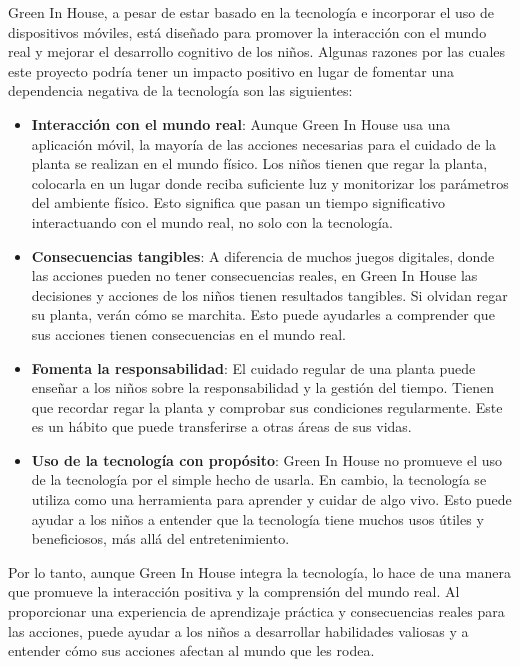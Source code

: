 Green In House, a pesar de estar basado en la tecnología e incorporar el uso de dispositivos móviles, está diseñado para promover la interacción con el mundo real y mejorar el desarrollo cognitivo de los niños. Algunas razones por las cuales este proyecto podría tener un impacto positivo en lugar de fomentar una dependencia negativa de la tecnología son las siguientes:

\begin{itemize}

    \item \textbf{Interacción con el mundo real}: Aunque Green In House usa una aplicación móvil, la mayoría de las acciones necesarias para el cuidado de la planta se realizan en el mundo físico. Los niños tienen que regar la planta, colocarla en un lugar donde reciba suficiente luz y monitorizar los parámetros del ambiente físico. Esto significa que pasan un tiempo significativo interactuando con el mundo real, no solo con la tecnología.
    
    \item \textbf{Consecuencias tangibles}: A diferencia de muchos juegos digitales, donde las acciones pueden no tener consecuencias reales, en Green In House las decisiones y acciones de los niños tienen resultados tangibles. Si olvidan regar su planta, verán cómo se marchita. Esto puede ayudarles a comprender que sus acciones tienen consecuencias en el mundo real.
    
    \item \textbf{Fomenta la responsabilidad}: El cuidado regular de una planta puede enseñar a los niños sobre la responsabilidad y la gestión del tiempo. Tienen que recordar regar la planta y comprobar sus condiciones regularmente. Este es un hábito que puede transferirse a otras áreas de sus vidas.
    
    \item \textbf{Uso de la tecnología con propósito}: Green In House no promueve el uso de la tecnología por el simple hecho de usarla. En cambio, la tecnología se utiliza como una herramienta para aprender y cuidar de algo vivo. Esto puede ayudar a los niños a entender que la tecnología tiene muchos usos útiles y beneficiosos, más allá del entretenimiento.

\end{itemize}

Por lo tanto, aunque Green In House integra la tecnología, lo hace de una manera que promueve la interacción positiva y la comprensión del mundo real. Al proporcionar una experiencia de aprendizaje práctica y consecuencias reales para las acciones, puede ayudar a los niños a desarrollar habilidades valiosas y a entender cómo sus acciones afectan al mundo que les rodea.

